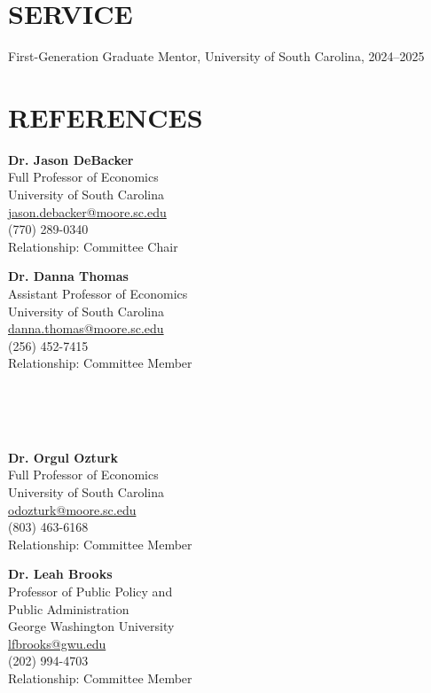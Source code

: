 \documentclass[11pt,letterpaper]{article}
\begin{document}
\section*{SERVICE}
First-Generation Graduate Mentor, University of South Carolina, 2024--2025

\noindent\begin{minipage}{\textwidth} %
\section*{REFERENCES}
\noindent
\begin{minipage}[t]{0.48\textwidth}
\textbf{Dr. Jason DeBacker} \\
Full Professor of Economics \\
University of South Carolina \\
\href{mailto:jason.debacker@moore.sc.edu}{jason.debacker@moore.sc.edu} \\
(770) 289-0340 \\
Relationship: Committee Chair
\end{minipage}
\hfill
\begin{minipage}[t]{0.48\textwidth}
\textbf{Dr. Danna Thomas} \\
Assistant Professor of Economics \\
University of South Carolina \\
\href{mailto:danna.thomas@moore.sc.edu}{danna.thomas@moore.sc.edu} \\
(256) 452-7415 \\
Relationship: Committee Member
\end{minipage}
\\ \\ \\
\noindent
\begin{minipage}[t]{0.48\textwidth}
\textbf{Dr. Orgul Ozturk} \\
Full Professor of Economics \\
University of South Carolina \\
\href{mailto:odozturk@moore.sc.edu}{odozturk@moore.sc.edu} \\
(803) 463-6168 \\
Relationship: Committee Member
\end{minipage}
\hfill
\begin{minipage}[t]{0.48\textwidth}
\textbf{Dr. Leah Brooks} \\
Professor of Public Policy and \\ Public Administration \\
George Washington University \\
\href{mailto:lfbrooks@gwu.edu}{lfbrooks@gwu.edu} \\
(202) 994-4703 \\
Relationship: Committee Member
\end{minipage}
\end{minipage}
\end{document}

